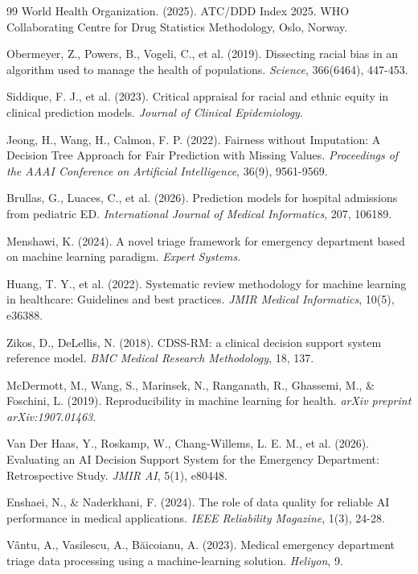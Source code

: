 \documentclass[harvard,article]{frontiersinFPHY_FAMS}
\begin{document}
\begin{thebibliography}{99}
 World Health Organization. (2025). ATC/DDD Index 2025. WHO Collaborating Centre for Drug Statistics Methodology, Oslo, Norway.

 Obermeyer, Z., Powers, B., Vogeli, C., et al. (2019). Dissecting racial bias in an algorithm used to manage the health of populations. \textit{Science}, 366(6464), 447-453.

 Siddique, F. J., et al. (2023). Critical appraisal for racial and ethnic equity in clinical prediction models. \textit{Journal of Clinical Epidemiology}.

 Jeong, H., Wang, H., Calmon, F. P. (2022). Fairness without Imputation: A Decision Tree Approach for Fair Prediction with Missing Values. \textit{Proceedings of the AAAI Conference on Artificial Intelligence}, 36(9), 9561-9569.

 Brullas, G., Luaces, C., et al. (2026). Prediction models for hospital admissions from pediatric ED. \textit{International Journal of Medical Informatics}, 207, 106189.

 Menshawi, K. (2024). A novel triage framework for emergency department based on machine learning paradigm. \textit{Expert Systems}.

 Huang, T. Y., et al. (2022). Systematic review methodology for machine learning in healthcare: Guidelines and best practices. \textit{JMIR Medical Informatics}, 10(5), e36388.

 Zikos, D., DeLellis, N. (2018). CDSS-RM: a clinical decision support system reference model. \textit{BMC Medical Research Methodology}, 18, 137.

 McDermott, M., Wang, S., Marinsek, N., Ranganath, R., Ghassemi, M., \& Foschini, L. (2019). Reproducibility in machine learning for health. \textit{arXiv preprint arXiv:1907.01463}.

 Van Der Haas, Y., Roskamp, W., Chang-Willems, L. E. M., et al. (2026). Evaluating an AI Decision Support System for the Emergency Department: Retrospective Study. \textit{JMIR AI}, 5(1), e80448.

 Enshaei, N., \& Naderkhani, F. (2024). The role of data quality for reliable AI performance in medical applications. \textit{IEEE Reliability Magazine}, 1(3), 24-28.

 Vântu, A., Vasilescu, A., Băicoianu, A. (2023). Medical emergency department triage data processing using a machine-learning solution. \textit{Heliyon}, 9.


\end{thebibliography}
\end{document}
